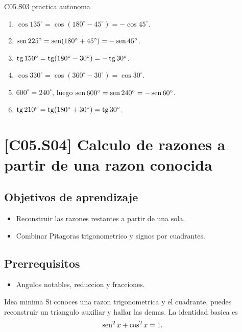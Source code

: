 \begin{fullsolution}{C05.S03 practica autonoma}
\begin{enumerate}[label=\textbf{PX-C05.S03-\arabic*:}, leftmargin=*]
  \item \(\cos 135^\circ=\cos(180^\circ-45^\circ)=-\cos 45^\circ\).
  \item \(\operatorname{sen} 225^\circ=\operatorname{sen}(180^\circ+45^\circ)=-\operatorname{sen} 45^\circ\).
  \item \(\operatorname{tg} 150^\circ=\operatorname{tg}(180^\circ-30^\circ)=-\operatorname{tg} 30^\circ\).
  \item \(\cos 330^\circ=\cos(360^\circ-30^\circ)=\cos 30^\circ\).
  \item \(600^\circ=240^\circ\), luego \(\operatorname{sen} 600^\circ=\operatorname{sen} 240^\circ=-\operatorname{sen} 60^\circ\).
  \item \(\operatorname{tg} 210^\circ=\operatorname{tg}(180^\circ+30^\circ)=\operatorname{tg} 30^\circ\).
\end{enumerate}
\end{fullsolution}

\section{[C05.S04] Calculo de razones a partir de una razon conocida}

\subsection*{Objetivos de aprendizaje}
\begin{itemize}
  \item Reconstruir las razones restantes a partir de una sola.
  \item Combinar Pitagoras trigonometrico y signos por cuadrantes.
\end{itemize}

\subsection*{Prerrequisitos}
\begin{itemize}
  \item Angulos notables, reduccion y fracciones.
\end{itemize}

\begin{theorybox}{Idea minima}
Si conoces una razon trigonometrica y el cuadrante, puedes reconstruir un triangulo auxiliar y
hallar las demas. La identidad basica es
\[
\operatorname{sen}^2 x+\cos^2 x=1.
\]
\end{theorybox}

